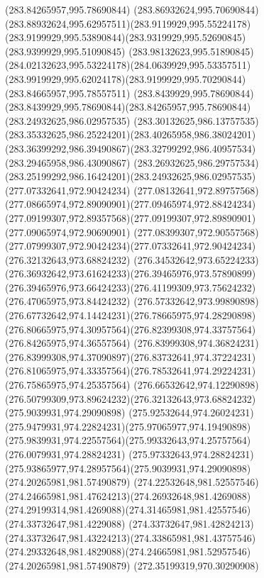 {    \moveto(283.84265957,995.78690844)
    \curveto(283.86932624,995.70690844)(283.88932624,995.62957511)(283.9119929,995.55224178)
    \curveto(283.9199929,995.53890844)(283.9319929,995.52690845)(283.9399929,995.51090845)
    \curveto(283.98132623,995.51890845)(284.02132623,995.53224178)(284.0639929,995.53357511)
    \curveto(283.9919929,995.62024178)(283.9199929,995.70290844)(283.84665957,995.78557511)
    \curveto(283.8439929,995.78690844)(283.8439929,995.78690844)(283.84265957,995.78690844)
    \moveto(283.24932625,986.02957535)
    \curveto(283.30132625,986.13757535)(283.35332625,986.25224201)(283.40265958,986.38024201)
    \curveto(283.36399292,986.39490867)(283.32799292,986.40957534)(283.29465958,986.43090867)
    \curveto(283.26932625,986.29757534)(283.25199292,986.16424201)(283.24932625,986.02957535)
    \moveto(277.07332641,972.90424234)
    \curveto(277.08132641,972.89757568)(277.08665974,972.89090901)(277.09465974,972.88424234)
    \curveto(277.09199307,972.89357568)(277.09199307,972.89890901)(277.09065974,972.90690901)
    \curveto(277.08399307,972.90557568)(277.07999307,972.90424234)(277.07332641,972.90424234)
    \moveto(276.32132643,973.68824232)
    \curveto(276.34532642,973.65224233)(276.36932642,973.61624233)(276.39465976,973.57890899)
    \curveto(276.39465976,973.66424233)(276.41199309,973.75624232)(276.47065975,973.84424232)
    \curveto(276.57332642,973.99890898)(276.67732642,974.14424231)(276.78665975,974.28290898)
    \curveto(276.80665975,974.30957564)(276.82399308,974.33757564)(276.84265975,974.36557564)
    \curveto(276.83999308,974.36824231)(276.83999308,974.37090897)(276.83732641,974.37224231)
    \curveto(276.81065975,974.33357564)(276.78532641,974.29224231)(276.75865975,974.25357564)
    \curveto(276.66532642,974.12290898)(276.50799309,973.89624232)(276.32132643,973.68824232)
    \moveto(275.9039931,974.29090898)
    \curveto(275.92532644,974.26024231)(275.9479931,974.22824231)(275.97065977,974.19490898)
    \curveto(275.9839931,974.22557564)(275.99332643,974.25757564)(276.0079931,974.28824231)
    \curveto(275.97332643,974.28824231)(275.93865977,974.28957564)(275.9039931,974.29090898)
    \moveto(274.20265981,981.57490879)
    \curveto(274.22532648,981.52557546)(274.24665981,981.47624213)(274.26932648,981.4269088)
    \curveto(274.29199314,981.4269088)(274.31465981,981.42557546)(274.33732647,981.4229088)
    \curveto(274.33732647,981.42824213)(274.33732647,981.43224213)(274.33865981,981.43757546)
    \curveto(274.29332648,981.4829088)(274.24665981,981.52957546)(274.20265981,981.57490879)
    \moveto(272.35199319,970.30290908)
}
